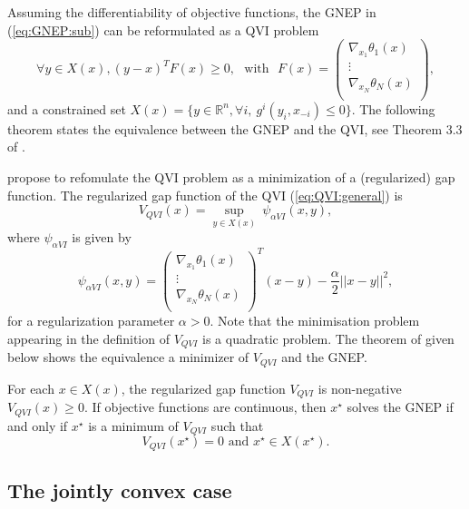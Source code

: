 \documentclass[11pt]{article}
\newcommand{\txtm}[1]{\textrm{~~#1~~}}
\newcommand{\R}{\ensuremath{\mathbb{R}}}
\begin{document}
Assuming the differentiability of objective functions, the GNEP in  (\ref{eq:GNEP:sub}) can be reformulated as a QVI problem  
\begin{equation}
\forall y \in X(x), (y-x)^T F(x) \geq 0,
\txtm{with}
F(x) = 
\left( 
\begin{matrix}
\nabla_{x_1} \theta_1(x) \\
\vdots \\
\nabla_{x_N} \theta_N(x) \\
\end{matrix}
\right),
\label{eq:QVI:general}
\end{equation}
and a constrained set $X(x) = \{y \in \R^n, \forall i,~ g^i(y_i, x_{-i}) \leq 0 \}$.
The following theorem states the equivalence between the GNEP and the QVI, see Theorem 3.3 of \cite{facchkanz09b}. 

\cite{fukubo10} propose to refomulate the QVI problem as a minimization of a (regularized) gap function. 
The regularized gap function of the QVI (\ref{eq:QVI:general}) is
$$
V_{QVI}(x) = \underset{y\in X(x)}{\sup}~\psi_{\alpha VI}(x, y),
$$
where $\psi_{\alpha VI}$ is given by
\begin{equation}
\psi_{\alpha VI}(x, y) = \left( 
\begin{matrix}
\nabla_{x_1} \theta_1(x) \\
\vdots \\
\nabla_{x_N} \theta_N(x) \\
\end{matrix}
\right)^T (x-y) - \frac{\alpha}{2} ||x-y||^2,
\label{eq:psiVI}
\end{equation}
for a regularization parameter $\alpha>0$. 
Note that the minimisation problem appearing in the definition of $V_{QVI}$ is a quadratic problem. 
The  theorem of \cite{fukubo10} given below shows the equivalence a minimizer of $V_{QVI}$ and the GNEP.

For each $x\in X(x)$, the regularized gap function $V_{QVI}$ is non-negative $V_{QVI}(x) \geq 0$.
If objective functions are continuous, then $x^\star$ solves the GNEP if and only if $x^\star$ is a minimum of $V_{QVI}$ such that
\begin{equation}
V_{QVI}(x^\star)=0
\text{ and }
x^\star \in X(x^\star).
\label{eq:gapVI:general}
\end{equation}



\subsection{The jointly convex case}
\end{document}

